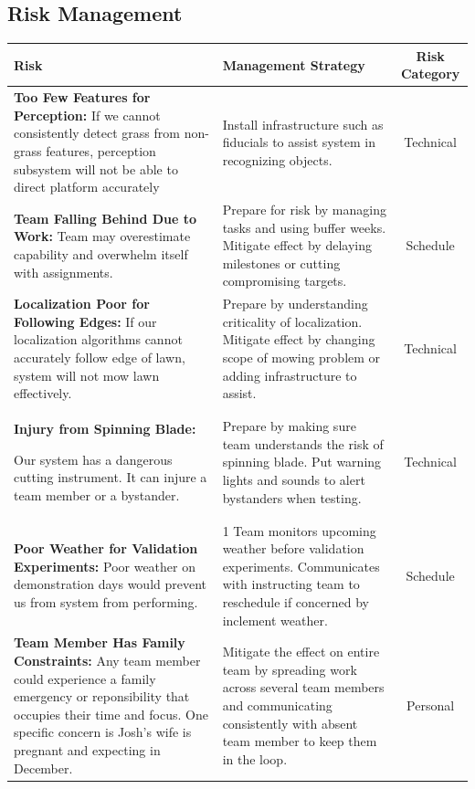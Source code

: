 \documentclass[12pt]{extarticle}
\begin{document}
\subsection{Risk Management}
\begin{table}[H]
\def\arraystretch{1.7}

\begin{tabular}{p{7cm}p{6cm}c}
\textbf{Risk} & \textbf{Management Strategy} & \textbf{Risk Category}\\
\hline 
\textbf{Too Few Features for Perception:} 
If we cannot consistently detect grass from non-grass features, perception subsystem will not be able to direct platform accurately
&
Install infrastructure such as fiducials to assist system in recognizing objects.
&
Technical\\

\textbf{Team Falling Behind Due to Work:} 
Team may overestimate capability and overwhelm itself with assignments.
&
Prepare for risk by managing tasks and using buffer weeks.  Mitigate effect by delaying milestones or cutting compromising targets.
&
Schedule\\
\textbf{Localization Poor for Following Edges:} 
If our localization algorithms cannot accurately follow edge of lawn, system will not mow lawn effectively.
&
Prepare by understanding criticality of localization.  Mitigate effect by changing scope of mowing problem or adding infrastructure to assist.
&
Technical\\
\textbf{Injury from Spinning Blade:} 

Our system has a dangerous cutting instrument.  It can injure a team member or a bystander.
&
Prepare by making sure team understands the risk of spinning blade.  Put warning lights and sounds to alert bystanders when testing.
&
Technical\\

\textbf{Poor Weather for Validation Experiments:} 
Poor weather on demonstration days would prevent us from system from performing.
&1
Team monitors upcoming weather before validation experiments.  Communicates with instructing team to reschedule if concerned by inclement weather.
&
Schedule\\

\textbf{Team Member Has Family Constraints:} 
Any team member could experience a family emergency or reponsibility that occupies their time and focus.  One specific concern is Josh's wife is pregnant and expecting in December.
&
Mitigate the effect on entire team by spreading work across several team members and communicating consistently with absent team member to keep them in the loop.
&
Personal\\


\end{tabular}
\end{table}
\end{document}
